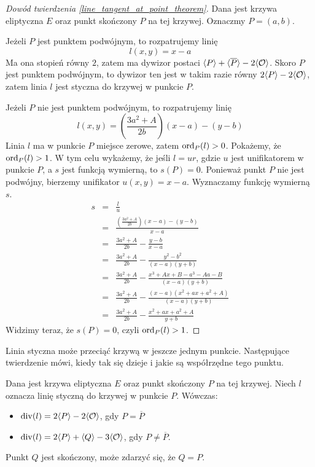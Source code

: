 \begin{proof}[Dowód twierdzenia \ref{line_tangent_at_point_theorem}]
Dana jest krzywa eliptyczna $E$
oraz punkt skończony $P$ na tej krzywej.
Oznaczmy $P = (a, b)$.

Jeżeli $P$ jest punktem podwójnym,
to rozpatrujemy linię
\begin{equation}
l(x, y) = x - a
\end{equation}
Ma ona stopień równy $2$,
zatem ma dywizor postaci $\langle P\rangle + \langle\overline{P}\rangle - 2\langle\mathcal{O}\rangle$.
Skoro $P$ jest punktem podwójnym, to dywizor ten jest w takim razie równy
$2\langle P\rangle - 2\langle\mathcal{O}\rangle$,
zatem linia $l$ jest styczna do krzywej w punkcie $P$.

Jeżeli $P$ nie jest punktem podwójnym,
to rozpatrujemy linię
\begin{equation}
l(x, y) = \left(\frac{3a^2 + A}{2b}\right)(x - a) - (y - b)
\end{equation}
Linia $l$ ma w punkcie $P$ miejsce zerowe, zatem $\operatorname{ord}_P(l) > 0$.
Pokażemy, że $\operatorname{ord}_P(l) > 1$.
W tym celu wykażemy, że jeśli $l = ur$,
gdzie $u$ jest unifikatorem w punkcie $P$,
a $s$ jest funkcją wymierną,
to $s(P) = 0$.
Ponieważ punkt $P$ nie jest podwójny,
bierzemy unifikator $u(x, y) = x - a$.
Wyznaczamy funkcję wymierną $s$.
\begin{eqnarray*}
s
& = & \frac{l}{u} \\
& = & \frac{\left(\frac{3a^2+A}{2b}\right)(x-a) - (y-b)}{x-a} \\
& = & \frac{3a^2+A}{2b} - \frac{y-b}{x-a} \\
& = & \frac{3a^2+A}{2b} - \frac{y^2-b^2}{(x-a)(y+b)} \\
& = & \frac{3a^2+A}{2b} - \frac{x^3+Ax+B - a^3-Aa-B}{(x-a)(y+b)} \\
& = & \frac{3a^2+A}{2b} - \frac{(x-a)(x^2+ax+a^2+A)}{(x-a)(y+b)} \\
& = & \frac{3a^2+A}{2b} - \frac{x^2+ax+a^2+A}{y+b}
\end{eqnarray*}
Widzimy teraz, że $s(P) = 0$,
czyli $\operatorname{ord}_P(l) > 1$.
\end{proof}

Linia styczna może przeciąć krzywą w jeszcze jednym punkcie.
Następujące twierdzenie mówi,
kiedy tak się dzieje
i jakie są współrzędne tego punktu.

\begin{theorem}
Dana jest krzywa eliptyczna $E$
oraz punkt skończony $P$ na tej krzywej.
Niech $l$ oznacza linię styczną do krzywej w punkcie $P$.
Wówczas:
\begin{itemize}
\item $\operatorname{div}(l) = 2\langle P\rangle - 2\langle\mathcal{O}\rangle$,
gdy $P = \overline{P}$
\item $\operatorname{div}(l) = 2\langle P\rangle + \langle Q\rangle - 3\langle\mathcal{O}\rangle$,
gdy $P \neq \overline{P}$.
\end{itemize}
Punkt $Q$ jest skończony,
może zdarzyć się, że $Q = P$.
\end{theorem}

